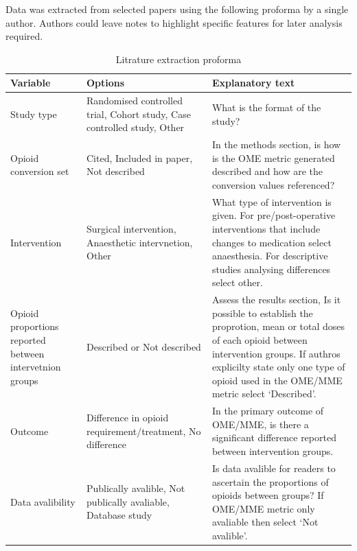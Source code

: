 \documentclass[
  letterpaper,
  DIV=11,
  numbers=noendperiod]{scrreprt}
\begin{document}
{Data was extracted from selected papers using the following proforma by
a single author. Authors could leave notes to highlight specific
features for later analysis required.

\begin{longtable}[]{@{}
  >{\raggedright\arraybackslash}p{}
  >{\raggedright\arraybackslash}p{}
  >{\raggedright\arraybackslash}p{}@{}}

\caption{\label{tbl-extraction-form}Litrature extraction proforma}

\tabularnewline

\toprule\noalign{}
\begin{minipage}[b]{\linewidth}\raggedright
Variable
\end{minipage} & \begin{minipage}[b]{\linewidth}\raggedright
Options
\end{minipage} & \begin{minipage}[b]{\linewidth}\raggedright
Explanatory text
\end{minipage} \\
\midrule\noalign{}
\endhead
\bottomrule\noalign{}
\endlastfoot
Study type & Randomised controlled trial, Cohort study, Case controlled
study, Other & What is the format of the study? \\
Opioid conversion set & Cited, Included in paper, Not described & In the
methods section, is how is the OME metric generated described and how
are the conversion values referenced? \\
Intervention & Surgical intervention, Anaesthetic intervnetion, Other &
What type of intervention is given. For pre/post-operative interventions
that include changes to medication select anaesthesia. For descriptive
studies analysing differences select other. \\
Opioid proportions reported between intervetnion groups & Described or
Not described & Assess the results section, Is it possible to establish
the proprotion, mean or total doses of each opioid between intervention
groups. If authros explicilty state only one type of opioid used in the
OME/MME metric select `Described'. \\
Outcome & Difference in opioid requirement/treatment, No difference & In
the primary outcome of OME/MME, is there a significant difference
reported between intervention groups. \\
Data avalibility & Publically avalible, Not publically avaliable,
Database study & Is data avalible for readers to ascertain the
proportions of opioids between groups? If OME/MME metric only avaliable
then select `Not avalible'. \\


\end{longtable}}
\end{document}

